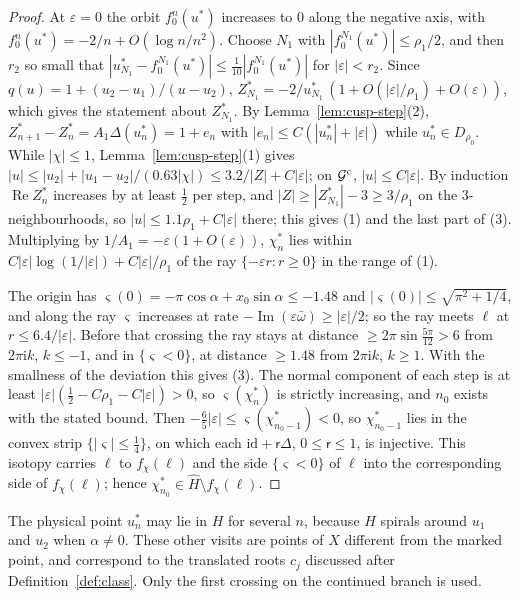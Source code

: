 \documentclass[11pt]{amsart}
\theoremstyle{definition}
\newcommand{\ii}{\mathrm{i}}
\begin{document}
\begin{proof}
At $\varepsilon=0$ the orbit $f_0^n(u^*)$ increases to $0$ along the negative axis,
with $f_0^n(u^*)=-2/n+O(\log n/n^2)$.  Choose $N_1$ with
$|f_0^{N_1}(u^*)|\le\rho_1/2$, and then $r_2$ so small that
$|u^*_{N_1}-f_0^{N_1}(u^*)|\le\tfrac1{10}|f_0^{N_1}(u^*)|$ for $|\varepsilon|<r_2$.
Since $q(u)=1+(u_2-u_1)/(u-u_2)$,
$Z^*_{N_1}=-2/u^*_{N_1}\,(1+O(|\varepsilon|/\rho_1)+O(\varepsilon))$, which gives the statement
about $Z^*_{N_1}$.  By Lemma~\ref{lem:cusp-step}(2),
$Z^*_{n+1}-Z^*_n=A_1\Delta(u^*_n)=1+e_n$ with $|e_n|\le C(|u^*_n|+|\varepsilon|)$ while
$u^*_n\in D_{\rho_0}$.  While $|\chi|\le1$, Lemma~\ref{lem:cusp-step}(1) gives
$|u|\le|u_2|+|u_1-u_2|/(0.63|\chi|)\le3.2/|Z|+C|\varepsilon|$; on $\mathcal G^{\rm c}$, $|u|\le C|\varepsilon|$.
By induction $\operatorname{Re}Z^*_n$ increases by at least $\tfrac12$ per step, and
$|Z|\ge|Z^*_{N_1}|-3\ge3/\rho_1$ on the $3$-neighbourhoods, so $|u|\le1.1\rho_1+C|\varepsilon|$
there; this gives (1) and the last part of (3).  Multiplying by
$1/A_1=-\varepsilon(1+O(\varepsilon))$, $\chi^*_n$ lies within $C|\varepsilon|\log(1/|\varepsilon|)+C|\varepsilon|/\rho_1$ of the
ray $\{-\varepsilon r:r\ge0\}$ in the range of (1).

The origin has $\varsigma(0)=-\pi\cos\alpha+x_0\sin\alpha\le-1.48$ and
$|\varsigma(0)|\le\sqrt{\pi^2+1/4}$, and along the ray $\varsigma$ increases at rate
$-\operatorname{Im}(\varepsilon\bar\omega)\ge|\varepsilon|/2$; so the ray meets $\ell$ at $r\le6.4/|\varepsilon|$.
Before that crossing the ray stays at distance $\ge2\pi\sin\tfrac{5\pi}{12}>6$ from
$2\pi\ii k$, $k\le-1$, and in $\{\varsigma<0\}$, at distance $\ge1.48$ from $2\pi\ii k$,
$k\ge1$.  With the smallness of the deviation this gives (3).  The normal
component of each step is at least $|\varepsilon|(\tfrac12-C\rho_1-C|\varepsilon|)>0$, so
$\varsigma(\chi^*_n)$ is strictly increasing, and $n_0$ exists with the stated bound.
Then $-\tfrac65|\varepsilon|\le\varsigma(\chi^*_{n_0-1})<0$, so $\chi^*_{n_0-1}$ lies in the convex strip
$\{|\varsigma|\le\tfrac14\}$, on which each $\mathrm{id}+\mathsf r\Delta$, $0\le \mathsf r\le1$, is injective.
This isotopy carries $\ell$ to $f_\chi(\ell)$ and the side $\{\varsigma<0\}$ of $\ell$ into
the corresponding side of $f_\chi(\ell)$; hence $\chi^*_{n_0}\in\hat H\setminus f_\chi(\ell)$.
\end{proof}

The physical point $u^*_{n}$ may lie in $H$ for several $n$, because $H$
spirals around $u_1$ and $u_2$ when $\alpha\ne0$.  These other visits are points of
$X$ different from the marked point, and correspond to the translated roots
$c_j$ discussed after Definition~\ref{def:class}.  Only the first crossing on
the continued branch is used.
\end{document}
